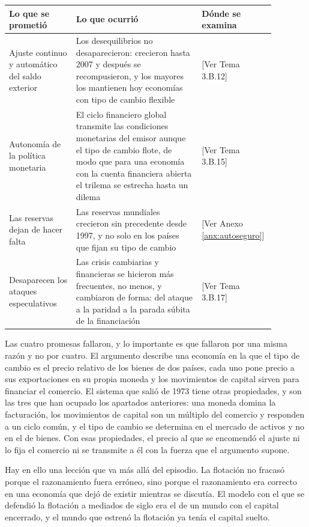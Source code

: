\documentclass[10pt,a4paper]{article}
\newcommand{\authorfont}[1]{{\fontfamily{EBGaramond-TLF}\selectfont #1}}
\begin{document}
\begin{center}
{\footnotesize
\begin{tabular}{|p{0.24\linewidth}|p{0.45\linewidth}|p{0.19\linewidth}|}
\hline
\textbf{Lo que se prometió} & \textbf{Lo que ocurrió} & \textbf{Dónde se examina} \\
\hline
Ajuste continuo y automático del saldo exterior & Los desequilibrios no desaparecieron: crecieron hasta 2007 y después se recompusieron, y los mayores los mantienen hoy economías con tipo de cambio flexible & [\authorfont{Ver Tema 3.B.12}] \\
\hline
Autonomía de la política monetaria & El ciclo financiero global transmite las condiciones monetarias del emisor aunque el tipo de cambio flote, de modo que para una economía con la cuenta financiera abierta el trilema se estrecha hasta un dilema & [\authorfont{Ver Tema 3.B.15}] \\
\hline
Las reservas dejan de hacer falta & Las reservas mundiales crecieron sin precedente desde 1997, y no solo en los países que fijan su tipo de cambio & [\authorfont{Ver Anexo \ref{anx:autoseguro}}] \\
\hline
Desaparecen los ataques especulativos & Las crisis cambiarias y financieras se hicieron más frecuentes, no menos, y cambiaron de forma: del ataque a la paridad a la parada súbita de la financiación & [\authorfont{Ver Tema 3.B.17}] \\
\hline
\end{tabular}}
\end{center}

Las cuatro promesas fallaron, y lo importante es que fallaron por una misma razón y no por cuatro. El argumento describe una economía en la que el tipo de cambio es el precio relativo de los bienes de dos países, cada uno pone precio a sus exportaciones en su propia moneda y los movimientos de capital sirven para financiar el comercio. El sistema que salió de 1973 tiene otras propiedades, y son las tres que han ocupado los apartados anteriores: una moneda domina la facturación, los movimientos de capital son un múltiplo del comercio y responden a un ciclo común, y el tipo de cambio se determina en el mercado de activos y no en el de bienes. Con esas propiedades, el precio al que se encomendó el ajuste ni lo fija el comercio ni se transmite a él con la fuerza que el argumento supone.

Hay en ello una lección que va más allá del episodio. La flotación no fracasó porque el razonamiento fuera erróneo, sino porque el razonamiento era correcto en una economía que dejó de existir mientras se discutía. El modelo con el que se defendió la flotación a mediados de siglo era el de un mundo con el capital encerrado, y el mundo que estrenó la flotación ya tenía el capital suelto.
\end{document}
